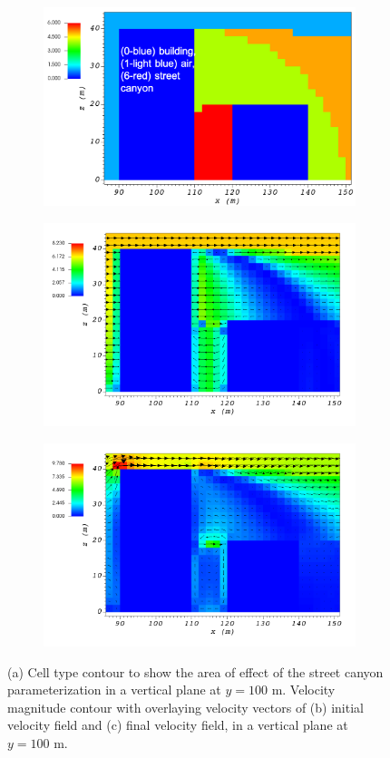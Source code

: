 \begin{figure}[H]
    \centering
    \begin{subfigure}{\textwidth}
    \centering
    \includegraphics[width=10.3cm,keepaspectratio]{Images/street_y_100_1_init_icell.png}
    \caption{}
    \end{subfigure}
    \begin{subfigure}{\textwidth}
    \centering
    \includegraphics[width=11.0cm,keepaspectratio]{Images/street_y_100_1_init_vel.png}
    \caption{}
    \end{subfigure}
    \begin{subfigure}{\textwidth}
    \centering
    \includegraphics[width=11.0cm,keepaspectratio]{Images/street_y_100_1_final.png}
    \caption{}
    \end{subfigure}
    \caption{(a) Cell type contour to show the area of effect of the street canyon parameterization in a vertical plane at $y=100$ m. Velocity magnitude contour with overlaying velocity vectors of (b) initial velocity field and (c) final velocity field, in a vertical plane at $y=100$ m.}
\end{figure}

